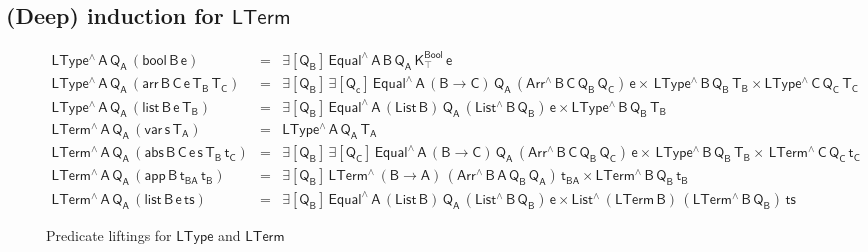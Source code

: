 \documentclass[sigplan,10pt]{acmart}
\begin{document}
\subsection{(Deep) induction for $\mathsf{LTerm}$}\label{sec:ind-lam} 

\begin{figure*}[t]


  \begin{adjustbox}{varwidth=7.3in, max width=7.1in, margin=-0.0in 0in
      -0.2in 0in, fbox, center} 

  {\small
\[\begin{array}{lll}
\mathsf{LType^{\wedge}\,A\,Q_A\,(bool\,B\,e)} & = &\mathsf{\exists
  [Q_B]\, Equal^{\wedge}\, A\, B\, Q_A\, K^{Bool}_{\top} \,e}\\
\mathsf{LType^{\wedge}\,A\,Q_A\,(arr\, B\, C\, e\, T_B\, T_C)}
&=&\mathsf{\exists [Q_B] \,\exists [Q_c]\, Equal^{\wedge}\,A\,
  (B \to C)\, Q_A\, (Arr^{\wedge} \, B\, C\, Q_B \, Q_C) \, e \times
  \, LType^{\wedge}\,B\,Q_B\,T_B \times LType^{\wedge}\,C\,Q_C\,T_C}\\
\mathsf{LType^{\wedge}\,A\,Q_A\,(list\, B\, e\, T_B)} & = &
\mathsf{\exists [Q_B]\, Equal^{\wedge}\,A\, (List\, B)\, Q_A\,
  (List^{\wedge} \, B\, Q_B) \, e \times LType^{\wedge}\,B\,Q_B\,T_B}\\[1ex]
\mathsf{LTerm^{\wedge}\,A\,Q_A\,(var\,s\,T_A)} & = &
\mathsf{LType^{\wedge}\, A\, Q_A\, T_A}\\
\mathsf{LTerm^{\wedge}\,A\,Q_A\, (abs \,B \,C \,e \,s \,T_B \,t_C)} &
= & \mathsf{\exists [Q_B]\,\exists [Q_C]\, Equal^{\wedge} \, A\, (B \to
  C)\, Q_A\, (Arr^{\wedge} \, B\, C\, Q_B \, Q_C)\, e \times \,
  LType^{\wedge}\, B\, Q_B\, T_B \times \, LTerm^{\wedge}\, C\, Q_C\,
  t_C }\\
\mathsf{LTerm^{\wedge}\,A\,Q_A\, (app\, B\, t_{BA}\, t_B)} & = &
\mathsf{\exists [Q_B]\, LTerm^{\wedge}\, (B \to A)\, (Arr^{\wedge} \,
  B\, A\, Q_B \, Q_A)\, t_{BA} \times LTerm^{\wedge}\, B\, Q_B\,
  t_B}\\
\mathsf{LTerm^{\wedge}\,A\,Q_A\, (list\, B\, e\, ts)} & = &
\mathsf{\exists [Q_B]\, Equal^{\wedge} \, A\, (List\,B)\, Q_A\,
  (List^{\wedge} \, B\, Q_B) \, e \times List^{\wedge}\, (LTerm\,B) \,
  (LTerm^{\wedge} \, B\, Q_B) \, ts}
\end{array}   \]}

\vspace*{-0.1in}

\caption{Predicate liftings for $\mathsf{LType}$ and
  $\mathsf{LTerm}$}\label{fig:liftings} \vspace*{0.1in} 
\end{adjustbox}
\end{figure*}
\end{document}
